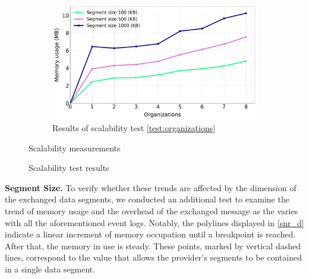 \begin{figure}[t]
	\begin{subfigure}{0.49\textwidth}   
		\centering
		\includegraphics[width=\textwidth]{content/figures/organizationstest-2.pdf}
		\caption{Results of scalability test \ref{test:organizations}}
		\label{fig:org_results}
	\end{subfigure}
	\begin{subtable}{0.49\textwidth}
		\centering
		\resizebox{0.97\textwidth}{!}{%
			
		}
		\label{table:TestCoefficentTable}
		\caption{Scalability measurements}
	\end{subtable}
	\caption{Scalability test results}
	\label{fig:scalabtest}
\end{figure}

\begin{newj}
\noindent\textbf{Segment Size.}
To verify whether these trends are affected by the dimension of the exchanged data segments, we conducted an additional test to examine the trend of memory usage and the overhead of the exchanged message as the {\SegSize} varies with all the aforementioned event logs. Notably, the polylines displayed in \cref{snr_d} indicate a linear increment of memory occupation until a breakpoint is reached. After that, the memory in use is steady. These points, marked by vertical dashed lines, correspond %
to the {\SegSize} value that allows the provider's segments to be contained in a single data segment.
\end{newj}



